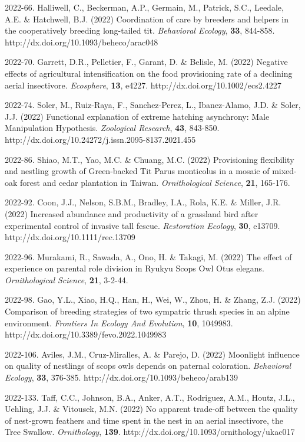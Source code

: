 2022-66. Halliwell, C., Beckerman, A.P., Germain, M., Patrick, S.C., Leedale, A.E. \&  Hatchwell, B.J. (2022) Coordination of care by breeders and helpers in the cooperatively breeding long-tailed tit. \textit{Behavioral Ecology},  \textbf{33}, 844-858. http://dx.doi.org/10.1093/beheco/arac048

2022-70. Garrett, D.R., Pelletier, F., Garant, D. \&  Belisle, M. (2022) Negative effects of agricultural intensification on the food provisioning rate of a declining aerial insectivore. \textit{Ecosphere},  \textbf{13}, e4227. http://dx.doi.org/10.1002/ecs2.4227

2022-74. Soler, M., Ruiz-Raya, F., Sanchez-Perez, L., Ibanez-Alamo, J.D. \&  Soler, J.J. (2022) Functional explanation of extreme hatching asynchrony: Male Manipulation Hypothesis. \textit{Zoological Research},  \textbf{43}, 843-850. http://dx.doi.org/10.24272/j.issn.2095-8137.2021.455

2022-86. Shiao, M.T., Yao, M.C. \&  Chuang, M.C. (2022) Provisioning flexibility and nestling growth of Green-backed Tit Parus monticolus in a mosaic of mixed-oak forest and cedar plantation in Taiwan. \textit{Ornithological Science},  \textbf{21}, 165-176. 

2022-92. Coon, J.J., Nelson, S.B.M., Bradley, I.A., Rola, K.E. \&  Miller, J.R. (2022) Increased abundance and productivity of a grassland bird after experimental control of invasive tall fescue. \textit{Restoration Ecology},  \textbf{30}, e13709. http://dx.doi.org/10.1111/rec.13709

2022-96. Murakami, R., Sawada, A., Ono, H. \&  Takagi, M. (2022) The effect of experience on parental role division in Ryukyu Scops Owl Otus elegans. \textit{Ornithological Science},  \textbf{21}, 3-2-44. 

2022-98. Gao, Y.L., Xiao, H.Q., Han, H., Wei, W., Zhou, H. \&  Zhang, Z.J. (2022) Comparison of breeding strategies of two sympatric thrush species in an alpine environment. \textit{Frontiers In Ecology And Evolution},  \textbf{10}, 1049983. http://dx.doi.org/10.3389/fevo.2022.1049983

2022-106. Aviles, J.M., Cruz-Miralles, A. \&  Parejo, D. (2022) Moonlight influence on quality of nestlings of scops owls depends on paternal coloration. \textit{Behavioral Ecology},  \textbf{33}, 376-385. http://dx.doi.org/10.1093/beheco/arab139

2022-133. Taff, C.C., Johnson, B.A., Anker, A.T., Rodriguez, A.M., Houtz, J.L., Uehling, J.J. \&  Vitousek, M.N. (2022) No apparent trade-off between the quality of nest-grown feathers and time spent in the nest in an aerial insectivore, the Tree Swallow. \textit{Ornithology},  \textbf{139}. http://dx.doi.org/10.1093/ornithology/ukac017

